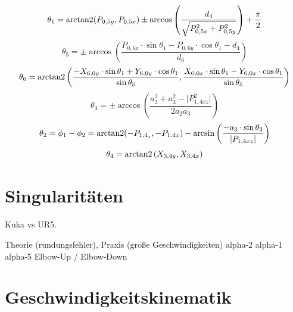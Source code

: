 \begin{equation}
    \theta_1 = \operatorname{arctan2}(P_{0,5y}, P_{0,5x}) \pm \arccos \left( \frac{d_4}{ \sqrt{ P_{0,5x}^2 + P_{0,5y}^2 }  } \right) + \frac{\pi}{2}
    \label{eq:inv7-1}
\end{equation}
\begin{equation}
    \theta_5 = \pm \arccos \left( \frac{ P_{0,6x} \cdot \sin\theta_1 - P_{0,6y} \cdot \cos\theta_1 - d_4 }{ d_6 } \right)
    \label{eq:inv7-2}
\end{equation}
\begin{equation}
    \theta_6 =
    \operatorname{arctan2}\left(
    \frac{
        -X_{6,0y} \cdot \sin\theta_1 + Y_{6,0y} \cdot \cos\theta_1
    }{
        \sin\theta_5
    },
    \frac{
        X_{6,0x} \cdot \sin\theta_1 - Y_{6,0x} \cdot \cos\theta_1
    }{
        \sin\theta_5
    }\right)
    \label{eq:inv7-3}
\end{equation}
\begin{equation}
    \theta_3 = \pm \arccos \left(  \frac{a_2^2 + a_3^2 - \lvert P_{1,4xz}^2 \rvert}{2 a_2 a_3} \right)
    \label{eq:inv7-4}
\end{equation}
\begin{equation}
    \theta_2 = \phi_1 - \phi_2 =
    \operatorname{arctan2}(-P_{1,4_z}, -P_{1,4x}) -
    \arcsin\left( \frac{-a_3\cdot \sin \theta_3}{\lvert P_{1,4xz}\rvert} \right)
    \label{eq:inv7-5}
\end{equation}
\begin{equation}
    \theta_4 = \operatorname{arctan2}\left( X_{3,4y}, X_{3,4x} \right)
    \label{eq:inv7-6}
\end{equation}


\section{Singularitäten}\label{sec:singularitaten}


Kuka vs UR5.

Theorie (rundungsfehler), Praxis (große Geschwindigkeiten)
alpha-2
alpha-1
alpha-5
Elbow-Up / Elbow-Down


\section{Geschwindigkeitskinematik}